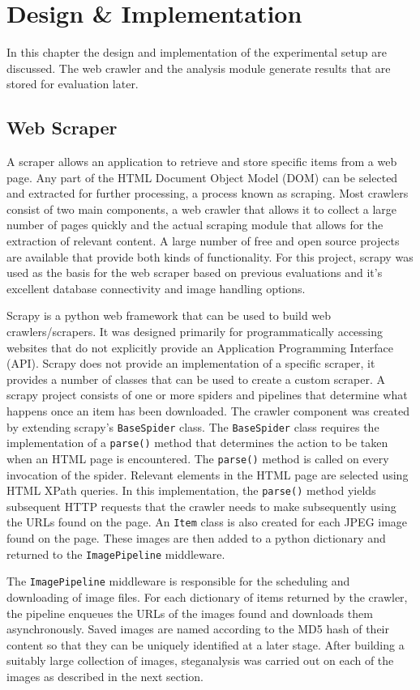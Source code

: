 \chapter{Design \& Implementation}
\label{ch:dev}
In this chapter the design and implementation of the experimental setup are discussed. The web crawler and the analysis module generate results that are stored for evaluation later.
\section {Web Scraper}
\label{sec:scraper}
A scraper allows an application to retrieve and store specific items from a web page. Any part of the HTML Document Object Model (DOM) can be selected and extracted for further processing, a process known as scraping. Most crawlers consist of two main components, a web crawler that allows it to collect a large number of pages quickly and the actual scraping module that allows for the extraction of relevant content. A large number of free and open source projects are available that provide both kinds of functionality. For this project, scrapy was used as the basis for the web scraper based on previous evaluations and it's excellent database connectivity and image handling options.
\par Scrapy is a python web framework that can be used to build web crawlers/scrapers. It was designed primarily for programmatically accessing websites that do not explicitly provide an Application Programming Interface (API). Scrapy does not provide an implementation of a specific scraper, it provides a number of classes that can be used to create a custom scraper. A scrapy project consists of one or more spiders and pipelines that determine what happens once an item has been downloaded. The crawler component was created by extending scrapy's \texttt{BaseSpider} class. The \texttt{BaseSpider} class requires the implementation of a \texttt{parse()} method that determines the action to be taken when an HTML page is encountered. The \texttt{parse()} method is called on every invocation of the spider. Relevant elements in the HTML page are selected using HTML XPath queries. In this implementation, the \texttt{parse()} method yields subsequent HTTP requests that the crawler needs to make subsequently using the URLs found on the page. An \texttt{Item} class is also created for each JPEG image found on the page. These images are then added to a python dictionary and returned to the \texttt{ImagePipeline} middleware.
\par The \texttt{ImagePipeline} middleware is responsible for the scheduling and downloading of image files. For each dictionary of items returned by the crawler, the pipeline enqueues the URLs of the images found and downloads them asynchronously. Saved images are named according to the MD5 hash of their content so that they can be uniquely identified at a later stage. After building a suitably large collection of images, steganalysis was carried out on each of the images as described in the next section.
